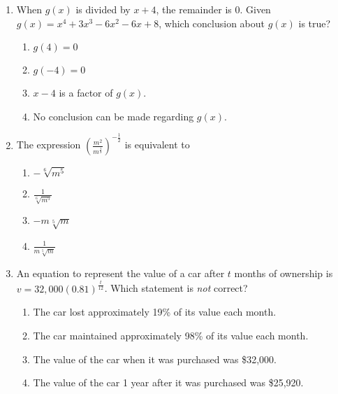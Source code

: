 \documentclass[12pt, oneside]{article}
\begin{document}
\begin{enumerate}
\item When $g(x)$ is divided by $x+4$, the remainder is 0. Given $g(x)= x^4+3x^3-6x^2-6x+8$, which conclusion about $g(x)$ is true?
\begin{enumerate}
    \item $g(4)=0$
    \item $g(-4)=0$
    \item $x-4$ is a factor of $g(x)$.
    \item No conclusion can be made regarding $g(x)$.
\end{enumerate} %

\newpage
\item The expression $\displaystyle \left( \frac{m^2}{m^\frac{1}{3}}\right)^{-\frac{1}{2}}$ is equivalent to 
\begin{enumerate}
    \item $-\sqrt[6]{m^5}$
    \item $\displaystyle \frac{1}{\sqrt[6]{m^5}}$
    \item $-m \sqrt[5]{m}$
    \item $\displaystyle \frac{1}{m \sqrt[5]{m}}$ \\[.5in]
\end{enumerate} %


\item An equation to represent the value of a car after $t$ months of ownership is\\ $\displaystyle v=32,000(0.81)^{\frac{t}{12}}$. Which statement is \emph{not} correct?
\begin{enumerate}
    \item The car lost approximately 19\% of its value each month.
    \item The car maintained approximately 98\% of its value each month.
    \item The value of the car when it was purchased was \$32,000.
    \item The value of the car 1 year after it was purchased was \$25,920.
\end{enumerate} %


\end{enumerate}
\end{document}
